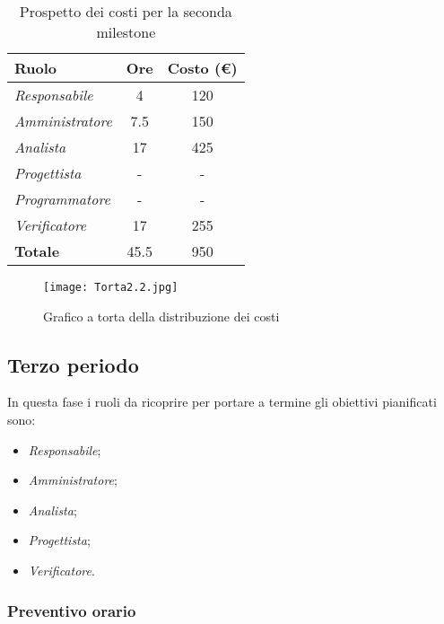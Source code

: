 \begin{table}[H]
    \centering
    \begin{tabular}{|l|c|c|}
    \hline
    \textbf{Ruolo} & \multicolumn{1}{l|}{\textbf{Ore}} & \multicolumn{1}{l|}{\textbf{Costo (€)}} \\ \hline
    \textit{Responsabile} & 4 & 120 \\ \hline
    \textit{Amministratore} & 7.5 & 150 \\ \hline
    \textit{Analista} & 17 & 425 \\ \hline
    \textit{Progettista} & - & - \\ \hline
    \textit{Programmatore} & - & - \\ \hline
    \textit{Verificatore} & 17 & 255 \\ \hline
    \textbf{Totale} & 45.5 & 950 \\ \hline
    \end{tabular}
    \caption{Prospetto dei costi per la seconda milestone}
\end{table}

\begin{figure}[H]
    \texttt{[image: Torta2.2.jpg]}
    \caption{Grafico a torta della distribuzione dei costi} 
\end{figure}



\newpage
\subsection{Terzo periodo}

In questa fase i ruoli da ricoprire per portare a termine gli obiettivi
pianificati sono:
\begin{itemize}
    \item \textit{Responsabile};
    \item \textit{Amministratore};
    \item \textit{Analista};
    \item \textit{Progettista};
    \item \textit{Verificatore}.
\end{itemize}

\subsubsection{Preventivo orario}

